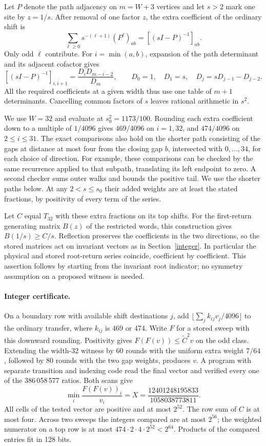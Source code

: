 \documentclass[11pt]{article}
\newcommand{\newnum}{12401248195833}
\newcommand{\newden}{1058038773811}
\begin{document}
Let \(P\) denote the path adjacency on \(m=W+3\) vertices and let \(s>2\) mark one site by \(z=1/s\). After removal of one factor \(z\), the extra coefficient of the ordinary shift is
\[
 \sum_{\ell\ge0}s^{-(\ell+1)}(P^\ell)_{ab}
       =[(sI-P)^{-1}]_{ab}.
\]
Only odd \(\ell\) contribute. For \(i=\min(a,b)\), expansion of the path determinant and its adjacent cofactor gives
\[
 [(sI-P)^{-1}]_{i,i+1}=\frac{D_iD_{m-i-2}}{D_m},
 \qquad D_0=1,\quad D_1=s,\quad D_j=sD_{j-1}-D_{j-2}.
\]
All the required coefficients at a given width thus use one table of \(m+1\) determinants. Cancelling common factors of \(s\) leaves rational arithmetic in \(s^2\).

We use \(W=32\) and evaluate at \(s_0^2=1173/100\). Rounding each extra coefficient down to a multiple of \(1/4096\) gives \(469/4096\) on \(i=1,32\), and \(474/4096\) on \(2\le i\le31\). The exact comparisons also hold on the shorter path consisting of the gaps at distance at most four from the closing gap \(b\), intersected with \(0,\ldots,34\), for each choice of direction. For example, these comparisons can be checked by the same recurrence applied to that subpath, translating its left endpoint to zero. A second checker sums outer walks and bounds the positive tail. We use the shorter paths below. At any \(2<s\le s_0\) their added weights are at least the stated fractions, by positivity of every term of the series.

Let \(C\) equal \(T_{32}\) with these extra fractions on its top shifts. For the first-return generating matrix \(B(z)\) of the restricted words, this construction gives \(B(1/s)\ge C/s\). Reflection preserves the coefficients in the two directions, so the stored matrices act on invariant vectors as in Section~\ref{integer}. In particular the physical and stored root-return series coincide, coefficient by coefficient. This assertion follows by starting from the invariant root indicator; no symmetry assumption on a proposed witness is needed.

\paragraph{Integer certificate.}
On a boundary row with available shift destinations \(j\), add \(\lfloor\sum_j k_{ij}v_j/4096\rfloor\) to the ordinary transfer, where \(k_{ij}\) is 469 or 474. Write \(F\) for a stored sweep with this downward rounding. Positivity gives \(F(F(v))\le \widetilde C^2v\) on the odd class. Extending the width-32 witness by 60 rounds with the uniform extra weight \(7/64\), followed by 80 rounds with the two gap weights, produces \(v\). A program with separate transition and indexing code read the final vector and verified every one of the 386\,058\,577 ratios. Both scans give
\[
             \min_i \frac{F(F(v))_i}{v_i}
                 = X=\frac{\newnum}{\newden}.
\]
All cells of the tested vector are positive and at most \(2^{52}\). The row sum of \(C\) is at most four. Across two sweeps the integers compared are at most \(2^{56}\); the weighted numerator on a top row is at most \(474\cdot 2\cdot 4\cdot2^{52}<2^{64}\). Products of the compared entries fit in 128 bits.
\end{document}
